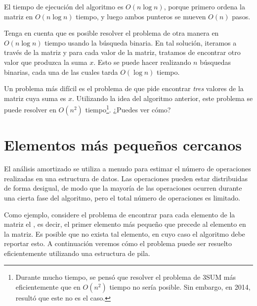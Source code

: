 \begin{center}
\end{center}

El tiempo de ejecución del algoritmo es
$O(n \log n)$, porque primero ordena
la matriz en $O(n \log n)$ tiempo,
y luego ambos punteros se mueven $O(n)$ pasos.

Tenga en cuenta que es posible resolver el problema
de otra manera en $O(n \log n)$ tiempo usando la búsqueda binaria.
En tal solución, iteramos a través de la matriz
y para cada valor de la matriz, tratamos de encontrar otro
valor que produzca la suma $x$.
Esto se puede hacer realizando $n$ búsquedas binarias,
cada una de las cuales tarda $O(\log n)$ tiempo.

Un problema más difícil es 
el problema de  que pide
encontrar \emph{tres} valores de la matriz
cuya suma es $x$.
Utilizando la idea del algoritmo anterior,
este problema se puede resolver en $O(n^2)$ tiempo\footnote{Durante mucho tiempo,
se pensó que resolver
el problema de 3SUM más eficientemente que en $O(n^2)$ tiempo
no sería posible.
Sin embargo, en 2014, resultó \cite{gro14}
que este no es el caso.}.
¿Puedes ver cómo?

\section{Elementos más pequeños cercanos}


El análisis amortizado se utiliza a menudo para
estimar el número de operaciones
realizadas en una estructura de datos.
Las operaciones pueden estar distribuidas de forma desigual, de modo que
la mayoría de las operaciones ocurren durante una
cierta fase del algoritmo, pero el total
número de operaciones es limitado.

Como ejemplo, considere el problema
de encontrar para cada elemento de la matriz
el , es decir,
el primer elemento más pequeño que precede al elemento
en la matriz.
Es posible que no exista tal elemento,
en cuyo caso el algoritmo debe reportar esto.
A continuación veremos cómo el problema puede ser
resuelto eficientemente utilizando una estructura de pila.

